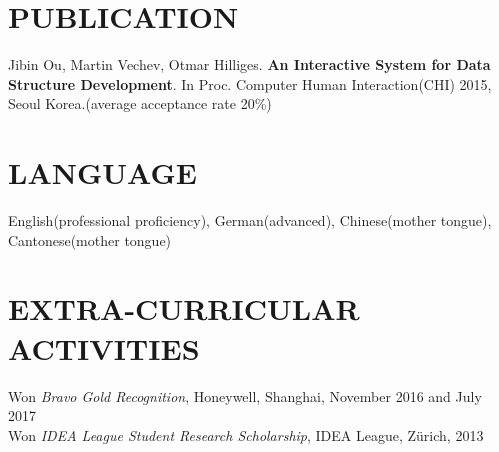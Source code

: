 \documentclass[margin, 10pt]{res} %
\begin{document}
\begin{resume}
\begin{CJK}{UTF8}{gbsn}

\section{PUBLICATION} 
Jibin Ou, Martin Vechev, Otmar Hilliges. \textbf{An Interactive System for Data Structure Development}.
In Proc. Computer Human Interaction(CHI) 2015, Seoul Korea.(average acceptance rate 20\%)


\section{LANGUAGE}
English(professional proficiency), German(advanced), Chinese(mother tongue), Cantonese(mother tongue)


\section{EXTRA-CURRICULAR \\ ACTIVITIES} 
Won {\it Bravo Gold Recognition}, Honeywell, Shanghai, November 2016 and July 2017 \\
Won {\it IDEA League Student Research Scholarship}, IDEA League, Zürich, 2013 \\

\end{CJK}
\end{resume}
\end{document}
